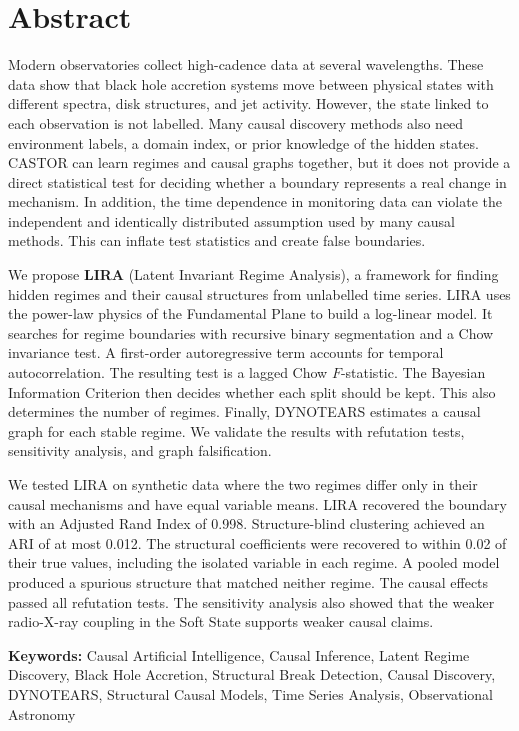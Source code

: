 \section*{Abstract}
Modern observatories collect high-cadence data at several wavelengths. These data
show that black hole accretion systems move between physical states with different
spectra, disk structures, and jet activity. However, the state linked to each
observation is not labelled. Many causal discovery methods also need environment
labels, a domain index, or prior knowledge of the hidden states. CASTOR can learn
regimes and causal graphs together, but it does not provide a direct statistical test
for deciding whether a boundary represents a real change in mechanism. In addition,
the time dependence in monitoring data can violate the independent and identically
distributed assumption used by many causal methods. This can inflate test statistics
and create false boundaries.

We propose \textbf{LIRA} (Latent Invariant Regime Analysis), a framework for finding
hidden regimes and their causal structures from unlabelled time series. LIRA uses
the power-law physics of the Fundamental Plane to build a log-linear model. It
searches for regime boundaries with recursive binary segmentation and a Chow
invariance test. A first-order autoregressive term accounts for temporal
autocorrelation. The resulting test is a lagged Chow $F$-statistic. The Bayesian
Information Criterion then decides whether each split should be kept. This also
determines the number of regimes. Finally, DYNOTEARS estimates a causal graph for
each stable regime. We validate the results with refutation tests, sensitivity
analysis, and graph falsification.

We tested LIRA on synthetic data where the two regimes differ only in their causal
mechanisms and have equal variable means. LIRA recovered the boundary with an
Adjusted Rand Index of 0.998. Structure-blind clustering achieved an ARI of at most
0.012. The structural coefficients were recovered to within 0.02 of their true
values, including the isolated variable in each regime. A pooled model produced a
spurious structure that matched neither regime. The causal effects passed all
refutation tests. The sensitivity analysis also showed that the weaker radio-X-ray
coupling in the Soft State supports weaker causal claims.

\vspace{1cm}
\textbf{Keywords:} 
Causal Artificial Intelligence, Causal Inference, Latent Regime Discovery,
Black Hole Accretion, Structural Break Detection, Causal Discovery, DYNOTEARS,
Structural Causal Models, Time Series Analysis, Observational Astronomy
\pagebreak
